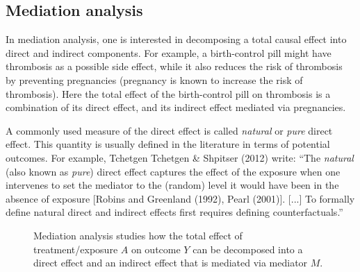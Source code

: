 \subsection{Mediation analysis}

In mediation analysis, one is interested in decomposing a total causal effect into direct and indirect components. 
For example, a birth-control pill might have thrombosis as a possible side effect, while it also reduces the risk of thrombosis by preventing pregnancies (pregnancy is known to increase the risk of thrombosis).
Here the total effect of the birth-control pill on thrombosis is a combination of its direct effect, and its indirect effect mediated via pregnancies.

A commonly used measure of the direct effect is called \emph{natural} or \emph{pure} direct effect.
This quantity is usually defined in the literature in terms of potential outcomes. 
For example, Tchetgen Tchetgen \& Shpitser (2012) write:
``The \emph{natural} (also known as \emph{pure}) direct effect captures the effect of the exposure when one 
intervenes to set the mediator to the (random) level it would have been in the absence of exposure [Robins and Greenland (1992), Pearl (2001)]. 
[...] To formally define natural direct and indirect effects first requires defining counterfactuals.''

\begin{figure}[!h]\centering
{}
\caption{\label{fig:mediation_analysis}Mediation analysis studies how the total effect
  of treatment/exposure $A$ on outcome $Y$ can be decomposed into a direct effect and 
  an indirect effect that is mediated via mediator $M$.}
\end{figure}

